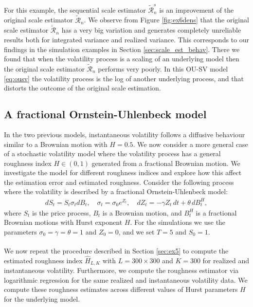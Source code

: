 \documentclass{article}
\begin{document}
For this example, the sequential scale estimator $\widetilde{\mathscr{R}}_n^s$ is an improvement of the original scale estimator $\widetilde{\mathscr{R}}_n$. We observe from Figure \ref{fig:ex6dens} that the original scale estimator $\widetilde{\mathscr{R}}_n$ has a very big variation and generates completely unreliable results both for integrated variance and realized variance. This corresponds to our findings in the simulation examples in Section \ref{sec:scale_est_behav}. There we found that when the volatility process is a scaling of an underlying model then the original scale estimator $\widetilde{\mathscr{R}}_n$ performs very poorly. In this OU-SV model \eqref{eq:ousv} the volatility process is the log of another underlying process, and that distorts the outcome of the original scale estimation.

\subsection{A fractional Ornstein-Uhlenbeck model} \label{sec:ex7}
In the two previous models, instantaneous volatility follows a diffusive behaviour similar to a Brownian motion with $H=0.5$. We now consider a more general case of a stochastic volatility model where the volatility process has a general roughness index $H\in(0,1)$ generated from a fractional Brownian motion. We investigate the model for different roughness indices and explore how this affect the estimation error and estimated roughness. Consider the following process where the volatility is described by a fractional Ornstein-Uhlenbeck model:
\begin{align}
dS_t = S_t \sigma_t dB_t, \quad \sigma_t = \sigma_0 e^{Z_t}, \quad dZ_t = -\gamma Z_t \, dt + \theta \, dB^H_t, \label{eq:fou}
\end{align}
where $S_t$ is the price process, $B_t$ is a Brownian motion, and $B_t^H$ is a fractional Brownian motions with Hurst exponent $H$. For the simulations we use the parameters $\sigma_0 =\gamma=\theta=1$ and $Z_0=0$, and we set $T=5$ and $S_0=1$.\\\\
We now repeat the procedure described in Section \ref{sec:ex5} to compute the estimated roughness index $\widehat{H}_{L,K}$ with $L=300\times 300$ and $K=300$ for realized and instantaneous volatility. Furthermore, we compute the roughness estimator via logarithmic regression for the same realized and instantaneous volatility data. We compute these roughness estimates across different values of Hurst parameters $H$ for the underlying model. \\
\end{document}

